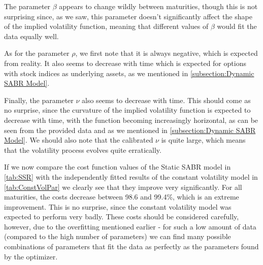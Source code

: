The parameter $\beta$ appears to change wildly between maturities, though this is not surprising since, as we saw, this parameter doesn't significantly affect the shape of the implied volatility function, meaning that different values of $\beta$ would fit the data equally well.

As for the parameter $\rho$, we first note that it is always negative, which is expected from reality. It also seems to decrease with time which is expected for options with stock indices as underlying assets, as we mentioned in \autoref{subsection:Dynamic SABR Model}.

Finally, the parameter $\nu$ also seems to decrease with time. This should come as no surprise, since the curvature of the implied volatility function is expected to decrease with time, with the function becoming increasingly horizontal, as can be seen from the provided data and as we mentioned in \autoref{subsection:Dynamic SABR Model}. We should also note that the calibrated $\nu$ is quite large, which means that the volatility process evolves quite erratically.


If we now compare the cost function values of the Static SABR model in \autoref{tab:SSR} with the independently fitted results of the constant volatility model in \autoref{tab:ConstVolPar} we clearly see that they improve very significantly. For all maturities, the costs decrease between 98.6 and 99.4\%, which is an extreme improvement. This is no surprise, since the constant volatility model was expected to perform very badly. These costs should be considered carefully, however, due to the overfitting mentioned earlier - for such a low amount of data (compared to the high number of parameters) we can find many possible combinations of parameters that fit the data as perfectly as the parameters found by the optimizer.

\vspace{\fill}
\newpage

